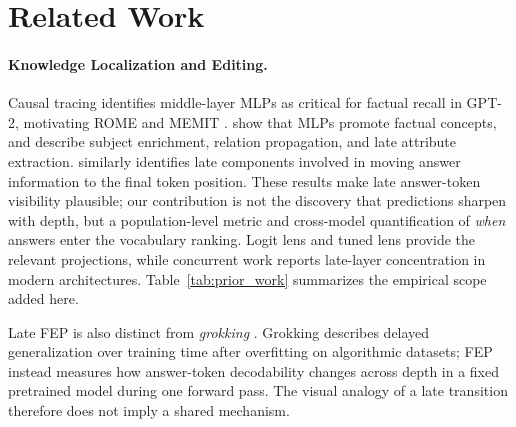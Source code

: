 \documentclass[11pt]{article}
\begin{document}
\section{Related Work}
\label{sec:related}

\paragraph{Knowledge Localization and Editing.}
Causal tracing \citep{meng2022locating} identifies middle-layer MLPs as critical for factual recall in GPT-2, motivating ROME and MEMIT \citep{meng2022mass}. \citet{geva2021transformer,geva2022transformer} show that MLPs promote factual concepts, and \citet{geva2023dissecting} describe subject enrichment, relation propagation, and late attribute extraction. \citet{nanda2023factfinding} similarly identifies late components involved in moving answer information to the final token position. These results make late answer-token visibility plausible; our contribution is not the discovery that predictions sharpen with depth, but a population-level metric and cross-model quantification of \emph{when} answers enter the vocabulary ranking. Logit lens \citep{nostalgebraist2020logitlens} and tuned lens \citep{belrose2023tuned} provide the relevant projections, while concurrent work \citep{wang2025logitlens4llms} reports late-layer concentration in modern architectures. Table~\ref{tab:prior_work} summarizes the empirical scope added here.

Late FEP is also distinct from \emph{grokking} \citep{power2022grokking}. Grokking describes delayed generalization over training time after overfitting on algorithmic datasets; FEP instead measures how answer-token decodability changes across depth in a fixed pretrained model during one forward pass. The visual analogy of a late transition therefore does not imply a shared mechanism.

\begin{table}[t]
\centering\small
{}
\caption{Comparison with prior logit lens studies.}
\label{tab:prior_work}
\end{table}
\end{document}
